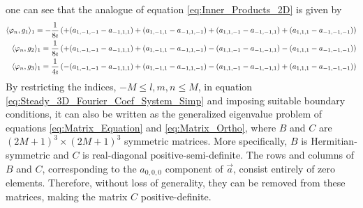 \documentclass[11pt]{amsart}
\begin{document}
one can see that the analogue of equation \eqref{eq:Inner_Products_2D}
is given by 
%
\begin{align}\label{eq:Inner_Products_3D}
  \langle\varphi_n,g_1\rangle_1=-\frac{1}{8\imath}&\left( +(a_{1,-1,-1}-a_{-1,1,1})
                              +(a_{1,-1,1}-a_{-1,1,-1})
                              +(a_{1,1,-1}-a_{-1,-1,1})
                              +(a_{1,1,1}-a_{-1,-1,-1})
  \right)               
              \notag\\
  \langle\varphi_n,g_2\rangle_1=\frac{1}{8\imath}&\left( +(a_{1,-1,-1}-a_{-1,1,1})
                             +(a_{1,-1,1}-a_{-1,1,-1})
                             -(a_{1,1,-1}-a_{-1,-1,1})
                             -(a_{1,1,1}-a_{-1,-1,-1})
  \right)               
               \notag\\
  \langle\varphi_n,g_3\rangle_1=\frac{1}{4\imath}&\left( -(a_{1,-1,-1}-a_{-1,1,1})
                             +(a_{1,-1,1}-a_{-1,1,-1})
                             -(a_{1,1,-1}-a_{-1,-1,1})
                             +(a_{1,1,1}-a_{-1,-1,-1})
  \right)               
\end{align}
%
By restricting the indices, $-M\leq l,m,n\leq M$, in equation
\eqref{eq:Steady_3D_Fourier_Coef_System_Simp} and imposing suitable
boundary conditions, it can also be written as the generalized
eigenvalue problem of equations \eqref{eq:Matrix_Equation} and
\eqref{eq:Matrix_Ortho}, where  $B$ and $C$ are $(2M+1)^3\times(2M+1)^3$
symmetric matrices. More specifically, $B$ is Hermitian-symmetric and
$C$ is real-diagonal positive-semi-definite. The rows and
columns of $B$ and $C$, corresponding to the $a_{0,0,0}$ component of
$\vec{a}$, consist entirely of zero elements. Therefore, without loss
of generality, they can be removed from these matrices, making the
matrix $C$ positive-definite.
%
\end{document}
